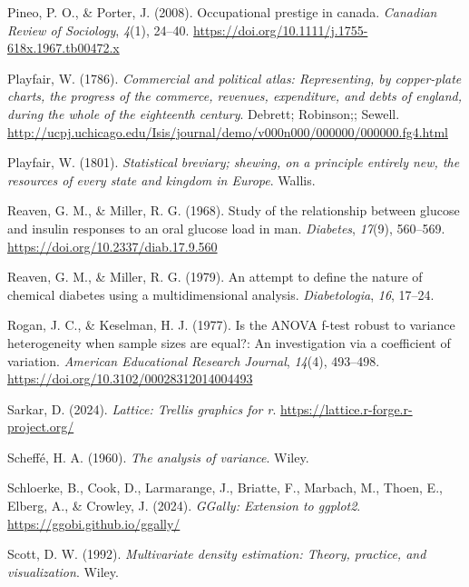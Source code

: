 \documentclass[
  letterpaper,
  10pt,
  krantz2]{krantz}
\newlength{\cslhangindent}
\newenvironment{CSLReferences}[2] %
 {\begin{list}{}{%
  \setlength{\itemindent}{0pt}
  \setlength{\leftmargin}{0pt}
  \setlength{\parsep}{0pt}
  \ifodd #1
   \setlength{\leftmargin}{\cslhangindent}
   \setlength{\itemindent}{-1\cslhangindent}
  \fi
  \setlength{\itemsep}{#2\baselineskip}}}
 {\end{list}}
\begin{document}
\begin{CSLReferences}{1}{0}
Pineo, P. O., \& Porter, J. (2008). Occupational prestige in canada.
\emph{Canadian Review of Sociology}, \emph{4}(1), 24--40.
\url{https://doi.org/10.1111/j.1755-618x.1967.tb00472.x}

Playfair, W. (1786). \emph{Commercial and political atlas: Representing,
by copper-plate charts, the progress of the commerce, revenues,
expenditure, and debts of england, during the whole of the eighteenth
century}. Debrett; Robinson;; Sewell.
\url{http://ucpj.uchicago.edu/Isis/journal/demo/v000n000/000000/000000.fg4.html}

Playfair, W. (1801). \emph{Statistical breviary; shewing, on a principle
entirely new, the resources of every state and kingdom in {Europe}}.
Wallis.

Reaven, G. M., \& Miller, R. G. (1968). Study of the relationship
between glucose and insulin responses to an oral glucose load in man.
\emph{Diabetes}, \emph{17}(9), 560--569.
\url{https://doi.org/10.2337/diab.17.9.560}

Reaven, G. M., \& Miller, R. G. (1979). An attempt to define the nature
of chemical diabetes using a multidimensional analysis.
\emph{Diabetologia}, \emph{16}, 17--24.

Rogan, J. C., \& Keselman, H. J. (1977). Is the {ANOVA} f-test robust to
variance heterogeneity when sample sizes are equal?: An investigation
via a coefficient of variation. \emph{American Educational Research
Journal}, \emph{14}(4), 493--498.
\url{https://doi.org/10.3102/00028312014004493}

Sarkar, D. (2024). \emph{Lattice: Trellis graphics for r}.
\url{https://lattice.r-forge.r-project.org/}

Scheffé, H. A. (1960). \emph{The analysis of variance}. Wiley.

Schloerke, B., Cook, D., Larmarange, J., Briatte, F., Marbach, M.,
Thoen, E., Elberg, A., \& Crowley, J. (2024). \emph{GGally: Extension to
ggplot2}. \url{https://ggobi.github.io/ggally/}

Scott, D. W. (1992). \emph{Multivariate density estimation: Theory,
practice, and visualization}. Wiley.


\end{CSLReferences}
\end{document}
